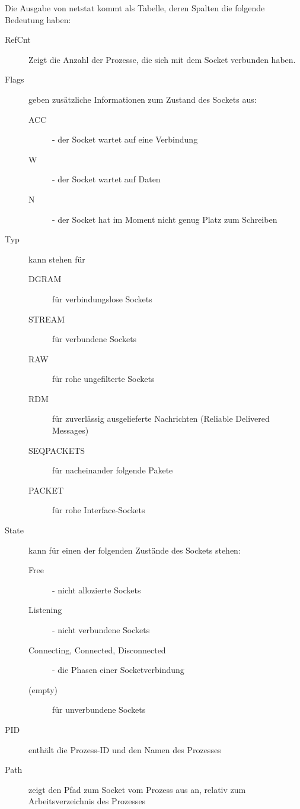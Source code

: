 \begin{normaltext}
  Die Ausgabe von netstat kommt als Tabelle, deren Spalten die folgende
  Bedeutung haben:
  \begin{description}
    \item[RefCnt] Zeigt die Anzahl der Prozesse, die sich mit dem Socket
      verbunden haben.
    \item[Flags] geben zusätzliche Informationen zum Zustand des Sockets aus:
      \begin{description}
        \item[ACC] - der Socket wartet auf eine Verbindung
        \item[W] - der Socket wartet auf Daten
        \item[N] - der Socket hat im Moment nicht genug Platz zum Schreiben
      \end{description}
    \item[Typ] kann stehen für
      \begin{description}
        \item[DGRAM] für verbindungslose Sockets
        \item[STREAM] für verbundene Sockets
        \item[RAW] für rohe ungefilterte Sockets %
        \item[RDM] für zuverlässig ausgelieferte Nachrichten (Reliable
          Delivered Messages)
        \item[SEQPACKETS] für nacheinander folgende Pakete %
        \item[PACKET] für rohe Interface-Sockets %
      \end{description}
    \item[State] kann für einen der folgenden Zustände des Sockets stehen:
      \begin{description}
        \item[Free] - nicht allozierte Sockets %
        \item[Listening] - nicht verbundene Sockets
        \item[Connecting, Connected, Disconnected] - die Phasen einer
          Socketverbindung
        \item[(empty)] für unverbundene Sockets %
      \end{description}
    \item[PID] enthält die Prozess-ID und den Namen des Prozesses
    \item[Path] zeigt den Pfad zum Socket vom Prozess aus an, relativ zum
      Arbeitsverzeichnis des Prozesses
  \end{description}
\end{normaltext}

